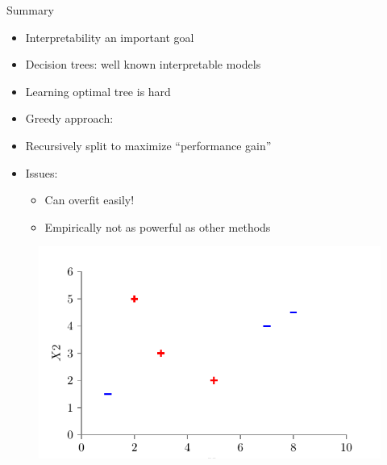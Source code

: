 \documentclass[usenames,dvipsnames]{beamer}
\begin{document}
\begin{frame}{Summary}
\begin{itemize}
	\item Interpretability an important goal
\item Decision trees: well known interpretable models
\item  Learning optimal tree is hard
\item  Greedy approach:
\item  Recursively split to maximize “performance gain”
\item  Issues:
\begin{itemize}
	\item Can overfit easily!
	\item  Empirically not as powerful as other methods
\end{itemize}
\end{itemize}

\end{frame}


\begin{frame}

	\begin{figure}
		\centering
		\includegraphics{../assets/decision-trees/figures/dt_weighted/fig1.pdf}
	\end{figure}
	
	
	\end{frame}
	
\end{document}
